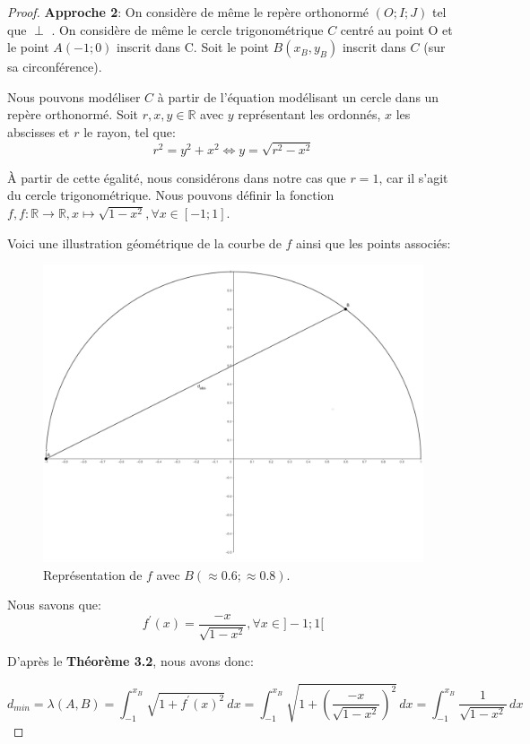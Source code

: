 \documentclass{amsart}
\theoremstyle{definition}
\theoremstyle{remark}
\numberwithin{equation}{section}
\renewcommand*{\overrightarrow}[1]{\vbox{\halign{##\cr 
  \tiny\rightarrowfill\cr\noalign{\nointerlineskip\vskip1pt} 
  $#1\mskip2mu$\cr}}}
\begin{document}
\begin{proof}
  \textbf{Approche 2}: On considère de même le repère orthonormé $(O;I;J)$ tel que \overrightarrow{OI} $\perp$ \overrightarrow{OJ}. On considère de même le cercle trigonométrique $C$ centré au point O et le point $A(-1;0)$ inscrit dans C. Soit le point
  $B(x_B,y_B)$ inscrit dans $C$ (sur sa circonférence).

  Nous pouvons modéliser $C$ à partir de l'équation modélisant un cercle dans un repère orthonormé. Soit $r,x,y\in\mathbb{R}$ avec $y$ représentant les ordonnés, $x$ les abscisses et $r$ le rayon, tel que:
  \[r^2=y^2+x^2 \Leftrightarrow  y = \sqrt{r^2-x^2}\]

  À partir de cette égalité, nous considérons dans notre cas que $r=1$, car il s'agit du cercle trigonométrique. Nous pouvons définir la fonction $f,f:\mathbb{R}\longrightarrow \mathbb{R}, x\longmapsto \sqrt{1-x^2}, \forall x\in[-1;1]$.

  Voici une illustration géométrique de la courbe de $f$ ainsi que les points associés:

  \begin{figure}[H]
    \centering
    \includegraphics[scale=0.13]{angle_function.png}
    \caption{Représentation de $f$ avec $B(\approx0.6;\approx0.8)$.}
  \end{figure}

  Nous savons que: \[f^\prime(x)=\frac{-x}{\sqrt{1-x^2}}, \forall x\in]-1;1[\]

  D'après le \textbf{Théorème 3.2}, nous avons donc:

  \[d_{min}=\lambda(A,B)=\int_{-1}^{x_B} \sqrt{1+{f^\prime}(x)^2} \,dx=\int_{-1}^{x_B} \sqrt{1+(\frac{-x}{\sqrt{1-x^2}})^2}\,dx=\int_{-1}^{x_B} \frac{1}{\sqrt{1-x^2}}\,dx\]


\end{proof}
\end{document}
